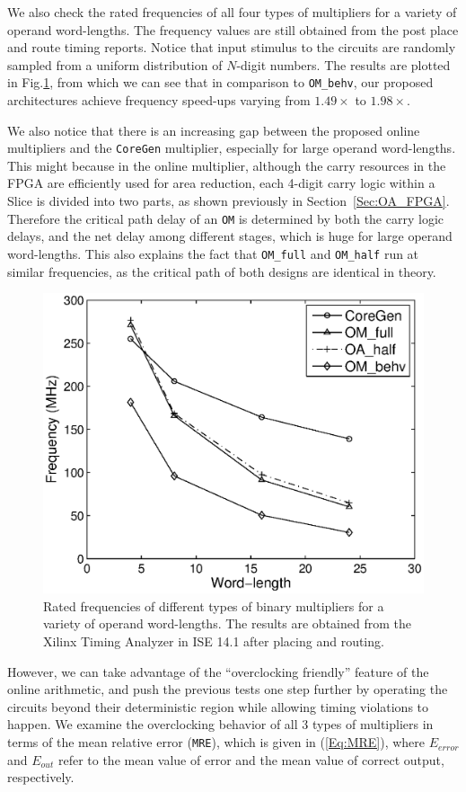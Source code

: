 \documentclass[conference]{IEEEtran}
\begin{document}
We also check the rated frequencies of all four types of multipliers for a variety of operand word-lengths. The frequency values are still obtained from the post place and route timing reports. Notice that input stimulus to the circuits are randomly sampled from a uniform distribution of $N$-digit numbers. The results are plotted in Fig.\ref{Fig:OM_Freq}, from which we can see that in comparison to \texttt{OM\_behv}, our proposed architectures achieve frequency speed-ups varying from $1.49\times$ to $1.98\times$.

We also notice that there is an increasing gap between the proposed online multipliers and the \texttt{CoreGen} multiplier, especially for large operand word-lengths. This might because in the online multiplier, although the carry resources in the FPGA are efficiently used for area reduction, each 4-digit carry logic within a Slice is divided into two parts, as shown previously in Section~\ref{Sec:OA_FPGA}. Therefore the critical path delay of an \texttt{OM} is determined by both the carry logic delays, and the net delay among different stages, which is huge for large operand word-lengths. This also explains the fact that \texttt{OM\_full} and \texttt{OM\_half} run at similar frequencies, as the critical path of both designs are identical in theory.

\begin{figure}[tbp]
	\centering
	\includegraphics[width=.48\textwidth]{./Figures/Exp/OM_Freq2.eps}
	\caption{Rated frequencies of different types of binary multipliers for a variety of operand word-lengths. The results are obtained from the Xilinx Timing Analyzer in ISE 14.1 after placing and routing.}
	\label{Fig:OM_Freq}

\end{figure}

However, we can take advantage of the ``overclocking friendly'' feature of the online arithmetic, and push the previous tests one step further by operating the circuits beyond their deterministic region while allowing timing violations to happen. We examine the overclocking behavior of all 3 types of multipliers in terms of the mean relative error (\texttt{MRE}), which is given in (\ref{Eq:MRE}), where $E_{error}$ and $E_{out}$ refer to the mean value of error and the mean value of correct output, respectively.
\end{document}

